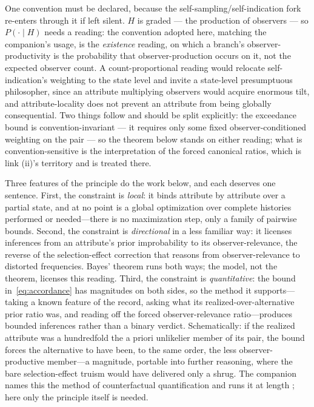 One convention must be declared, because the self-sampling/self-indication fork re-enters through it if left silent. $H$ is graded --- the production of observers --- so $P(\cdot \mid H)$ needs a reading: the convention adopted here, matching the companion's usage, is the \emph{existence} reading, on which a branch's observer-productivity is the probability that observer-production occurs on it, not the expected observer count. A count-proportional reading would relocate self-indication's weighting to the state level and invite a state-level presumptuous philosopher, since an attribute multiplying observers would acquire enormous tilt, and attribute-locality does not prevent an attribute from being globally consequential. Two things follow and should be split explicitly: the exceedance bound is convention-invariant --- it requires only some fixed observer-conditioned weighting on the pair --- so the theorem below stands on either reading; what is convention-sensitive is the interpretation of the forced canonical ratios, which is link (ii)'s territory and is treated there.

Three features of the principle do the work below, and each deserves one sentence. First, the constraint is \emph{local}: it binds attribute by attribute over a partial state, and at no point is a global optimization over complete histories performed or needed---there is no maximization step, only a family of pairwise bounds. Second, the constraint is \emph{directional} in a less familiar way: it licenses inferences from an attribute's prior improbability to its observer-relevance, the reverse of the selection-effect correction that reasons from observer-relevance to distorted frequencies. Bayes' theorem runs both ways; the model, not the theorem, licenses this reading. Third, the constraint is \emph{quantitative}: the bound in~\eqref{eq:accordance} has magnitudes on both sides, so the method it supports---taking a known feature of the record, asking what its realized-over-alternative prior ratio was, and reading off the forced observer-relevance ratio---produces bounded inferences rather than a binary verdict. Schematically: if the realized attribute was a hundredfold the a priori unlikelier member of its pair, the bound forces the alternative to have been, to the same order, the less observer-productive member---a magnitude, portable into further reasoning, where the bare selection-effect truism would have delivered only a shrug. The companion names this the method of counterfactual quantification and runs it at length \cite{Nexus}; here only the principle itself is needed.

